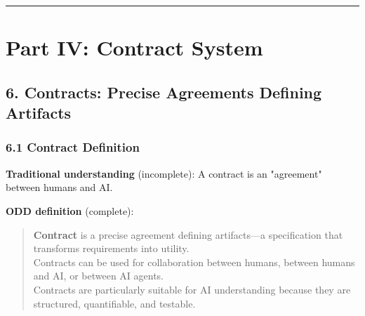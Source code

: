 \documentclass[
]{article}
\begin{document}
\begin{center}\rule{0.5\linewidth}{0.5pt}\end{center}

\hypertarget{part-iv-contract-system}{%
\section{Part IV: Contract System}\label{part-iv-contract-system}}

\hypertarget{6-contracts-precise-agreements-defining-artifacts}{%
\subsection{6. Contracts: Precise Agreements Defining
Artifacts}\label{6-contracts-precise-agreements-defining-artifacts}}

\hypertarget{61-contract-definition}{%
\subsubsection{6.1 Contract Definition}\label{61-contract-definition}}

\textbf{Traditional understanding} (incomplete): A contract is an
"agreement" between humans and AI.

\textbf{ODD definition} (complete):

\begin{quote}
\textbf{Contract} is a precise agreement defining artifacts---a
specification that transforms requirements into utility.\\
Contracts can be used for collaboration between humans, between humans
and AI, or between AI agents.\\
Contracts are particularly suitable for AI understanding because they
are structured, quantifiable, and testable.
\end{quote}
\end{document}
